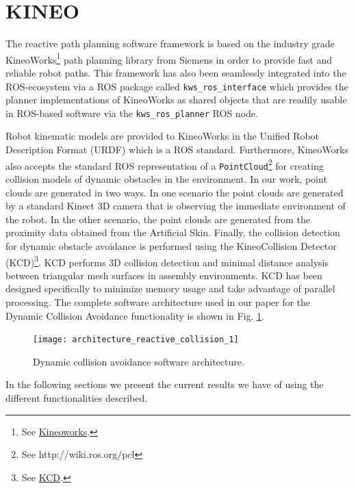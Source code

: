 \section{KINEO}
\hypersetup{colorlinks, linkcolor=blue}
The reactive path planning software framework is based on the industry grade KineoWorks\texttrademark\footnote{See
\href{http://www.plm.automation.siemens.com/en\_us/products/open/kineo/kineoworks/index.shtml}{Kineoworks}.} path planning library from Siemens in order to provide fast and reliable robot paths. This framework has also been seamlessly integrated into the ROS-ecosystem via a ROS package called \texttt{kws\_ros\_interface} which provides the planner implementations of KineoWorks as shared objects that are readily usable in ROS-based software via the \texttt{kws\_ros\_planner} ROS node.

Robot kinematic models are provided to KineoWorks in the Unified Robot Description Format (URDF) which is a ROS standard. Furthermore, KineoWorks also accepts the standard ROS representation of a \texttt{PointCloud}\footnote{See http://wiki.ros.org/pcl} for creating collision models of dynamic obstacles in the environment. In our work, point clouds are generated in two ways. In one scenario the point clouds are generated by a standard Kinect 3D camera that is observing the immediate environment of the robot. In the other scenario, the point clouds are generated from the proximity data obtained from the Artificial Skin. Finally, the collision detection for dynamic obstacle avoidance is performed using the Kineo\texttrademark Collision Detector (KCD)\footnote{See \href{http://www.plm.automation.siemens.com/en\_us/products/open/kineo/collision-detector/index.shtml}{KCD}.}. KCD performs 3D collision detection and minimal distance analysis between triangular mesh surfaces in assembly environments. KCD has been designed specifically to minimize memory usage and take advantage of parallel processing. The complete software architecture used in our paper for the Dynamic Collision Avoidance functionality is shown in Fig. \ref{fig:dca}.
\begin{figure}[t]
\centering
\texttt{[image: architecture\_reactive\_collision\_1]}
\caption[]{Dynamic collision avoidance software architecture.}
\label{fig:dca}
\end{figure}

In the following sections we present the current results we have of using the different functionalities described.




